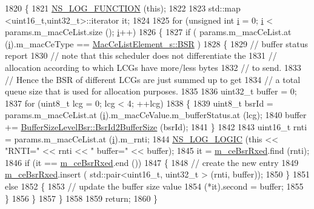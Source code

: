 \begin{DoxyCode}
1820 \{
1821   \hyperlink{log-macros-disabled_8h_a90b90d5bad1f39cb1b64923ea94c0761}{NS\_LOG\_FUNCTION} (\textcolor{keyword}{this});
1822 
1823   std::map <uint16\_t,uint32\_t>::iterator it;
1824 
1825   \textcolor{keywordflow}{for} (\textcolor{keywordtype}{unsigned} \textcolor{keywordtype}{int} \hyperlink{bernuolliDistribution_8m_a6f6ccfcf58b31cb6412107d9d5281426}{i} = 0; \hyperlink{bernuolliDistribution_8m_a6f6ccfcf58b31cb6412107d9d5281426}{i} < params.m\_macCeList.size (); \hyperlink{bernuolliDistribution_8m_a6f6ccfcf58b31cb6412107d9d5281426}{i}++)
1826     \{
1827       \textcolor{keywordflow}{if} ( params.m\_macCeList.at (\hyperlink{bernuolliDistribution_8m_a6f6ccfcf58b31cb6412107d9d5281426}{i}).m\_macCeType == \hyperlink{structns3_1_1MacCeListElement__s_a270a6526dfc7da02e9dc91823c290f6bac50796b01160b1825ec34efa1ad9f051}{MacCeListElement\_s::BSR} )
1828         \{
1829           \textcolor{comment}{// buffer status report}
1830           \textcolor{comment}{// note that this scheduler does not differentiate the}
1831           \textcolor{comment}{// allocation according to which LCGs have more/less bytes}
1832           \textcolor{comment}{// to send.}
1833           \textcolor{comment}{// Hence the BSR of different LCGs are just summed up to get}
1834           \textcolor{comment}{// a total queue size that is used for allocation purposes.}
1835 
1836           uint32\_t buffer = 0;
1837           \textcolor{keywordflow}{for} (uint8\_t lcg = 0; lcg < 4; ++lcg)
1838             \{
1839               uint8\_t bsrId = params.m\_macCeList.at (\hyperlink{bernuolliDistribution_8m_a6f6ccfcf58b31cb6412107d9d5281426}{i}).m\_macCeValue.m\_bufferStatus.at (lcg);
1840               buffer += \hyperlink{classns3_1_1BufferSizeLevelBsr_a67fc905f267ed8ac5a617fe229699122}{BufferSizeLevelBsr::BsrId2BufferSize} (bsrId);
1841             \}
1842 
1843           uint16\_t rnti = params.m\_macCeList.at (\hyperlink{bernuolliDistribution_8m_a6f6ccfcf58b31cb6412107d9d5281426}{i}).m\_rnti;
1844           \hyperlink{group__logging_ga88acd260151caf2db9c0fc84997f45ce}{NS\_LOG\_LOGIC} (\textcolor{keyword}{this} << \textcolor{stringliteral}{"RNTI="} << rnti << \textcolor{stringliteral}{" buffer="} << buffer);
1845           it = \hyperlink{classns3_1_1FdBetFfMacScheduler_a86411f2dd593676d88de396ef4d0b6e5}{m\_ceBsrRxed}.find (rnti);
1846           \textcolor{keywordflow}{if} (it == \hyperlink{classns3_1_1FdBetFfMacScheduler_a86411f2dd593676d88de396ef4d0b6e5}{m\_ceBsrRxed}.end ())
1847             \{
1848               \textcolor{comment}{// create the new entry}
1849               \hyperlink{classns3_1_1FdBetFfMacScheduler_a86411f2dd593676d88de396ef4d0b6e5}{m\_ceBsrRxed}.insert ( std::pair<uint16\_t, uint32\_t > (rnti, buffer));
1850             \}
1851           \textcolor{keywordflow}{else}
1852             \{
1853               \textcolor{comment}{// update the buffer size value}
1854               (*it).second = buffer;
1855             \}
1856         \}
1857     \}
1858 
1859   \textcolor{keywordflow}{return};
1860 \}
\end{DoxyCode}


